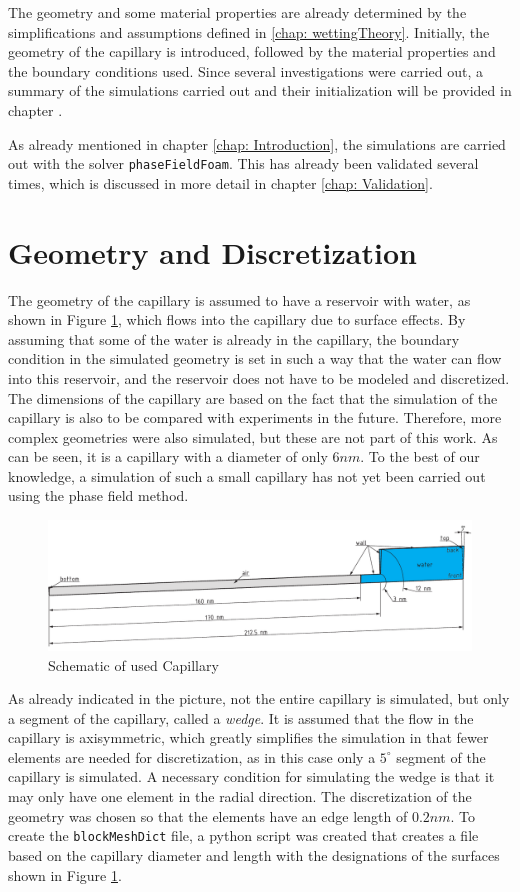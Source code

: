 The geometry and some material properties are already determined by the simplifications and assumptions defined in \ref{chap: wettingTheory}. Initially, the geometry of the capillary is introduced, followed by the material properties and the boundary conditions used. Since several investigations were carried out, a summary of the simulations carried out and their initialization will be provided in chapter .

As already mentioned in chapter \ref{chap: Introduction}, the simulations are carried out with the solver \texttt{phaseFieldFoam}. This has already been validated several times, which is discussed in more detail in chapter \ref{chap: Validation}.
\section{Geometry and Discretization}
The geometry of the capillary is assumed to have a reservoir with water, as shown in Figure \ref{fig: Capillary Geometry}, which flows into the capillary due to surface effects. By assuming that some of the water is already in the capillary, the boundary condition in the simulated geometry is set in such a way that the water can flow into this reservoir, and the reservoir does not have to be modeled and discretized. The dimensions of the capillary are based on the fact that the simulation of the capillary is also to be compared with experiments in the future. Therefore, more complex geometries were also simulated, but these are not part of this work. As can be seen, it is a capillary with a diameter of only $6nm$. To the best of our knowledge, a simulation of such a small capillary has not yet been carried out using the phase field method.

\begin{figure}[h]
    \centering
    \includegraphics[width=.95\textwidth]{Pictures/Cap_5DEG.pdf}
    \caption{Schematic of used Capillary}
    \label{fig: Capillary Geometry}
\end{figure}
As already indicated in the picture, not the entire capillary is simulated, but only a segment of the capillary, called a \textit{wedge}. It is assumed that the flow in the capillary is axisymmetric, which greatly simplifies the simulation in that fewer elements are needed for discretization, as in this case only a $5^{\circ}$ segment of the capillary is simulated. A necessary condition for simulating the wedge is that it may only have one element in the radial direction. The discretization of the geometry was chosen so that the elements have an edge length of $0.2nm$. To create the \texttt{blockMeshDict} file, a python script was created that creates a file based on the capillary diameter and length with the designations of the surfaces shown in Figure \ref{fig: Capillary Geometry}.

